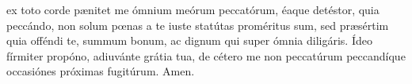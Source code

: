 ex toto corde p{\ae}nitet me ómnium meórum peccatórum, éaque detéstor, quia peccándo, non solum pœnas a te iuste statútas 
proméritus sum, sed pr{\ae}sértim quia offéndi te, summum bonum, ac dignum qui super ómnia diligáris. Ídeo fírmiter propóno, adiuvánte grátia tua, 
de cétero me non peccatúrum peccandíque occasiónes próximas fugitúrum. Amen.